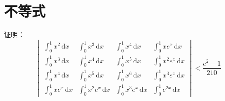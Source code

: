 \documentclass[color=green,titlestyle=hang]{elegantbook}%
\begin{document}

\chapter{不等式}

\begin{exercise}
证明：\begin{equation*}\begin{vmatrix}
\int_{0}^{1}x^2\,\mathrm{d}x&\int_{0}^{1}x^3\,\mathrm{d}x &\int_{0}^{1}x^4\,\mathrm{d}x&\int_{0}^{1}xe^x\,\mathrm{d}x\\[4mm]
\int_{0}^{1}x^3\,\mathrm{d}x&\int_{0}^{1}x^4\,\mathrm{d}x &\int_{0}^{1}x^5\,\mathrm{d}x&\int_{0}^{1}x^2e^x\,\mathrm{d}x\\[4mm]
\int_{0}^{1}x^4\,\mathrm{d}x&\int_{0}^{1}x^5\,\mathrm{d}x &\int_{0}^{1}x^6\,\mathrm{d}x&\int_{0}^{1}x^3e^x\,\mathrm{d}x\\[4mm]
\int_{0}^{1}xe^x\,\mathrm{d}x&\int_{0}^{1}x^2e^x\,\mathrm{d}x&\int_{0}^{1}x^3e^x\,\mathrm{d}x&\int_{0}^{1}e^{2x}\,\mathrm{d}x
\end{vmatrix}<\frac{e^2-1}{210}\end{equation*}					
\end{exercise}\begin{Solution}
\end{Solution}
\end{document}
